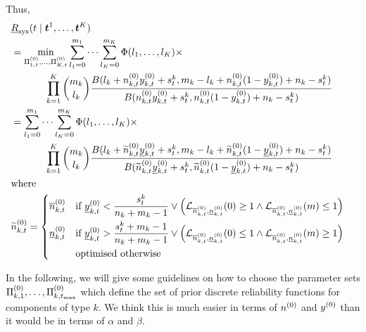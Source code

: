 \documentclass[12pt, a4paper]{elsarticle}
\newcommand{\bs}[1]{\boldsymbol{#1}}
\renewcommand{\vec}[1]{{\bs#1}}
\newcommand{\ul}[1]{\underline{#1}}
\newcommand{\ol}[1]{\overline{#1}}
\newcommand{\lRsys}{\ul{R}_\text{sys}}
\newcommand{\uRsys}{\ol{R}_\text{sys}}
\def\tmax{t_\text{max}}
\newcommand{\td}[1]{%
  \iftoggle{td}{%
    \todo[inline]{#1}%
  }{}%
}
\begin{document}
Thus,
\begin{align}
\lefteqn{\lRsys(t \mid \vec{t}^1, \ldots, \vec{t}^K)} \nonumber \\
 &= \min_{\PtZi{1}, \ldots, \PtZi{K}} 
    \sum_{l_1=0}^{m_1} \cdots \sum_{l_K=0}^{m_K} \Phi(l_1, \ldots, l_K) \times \nonumber \\ & \hspace*{8ex}
    \prod_{k=1}^K {m_k \choose l_k} \frac{B(l_k + \nktz\yktz + s^k_t, m_k - l_k + \nktz(1-\yktz) + n_k - s^k_t)}{B(\nktz\yktz + s^k_t, \nktz(1-\yktz) + n_k - s^k_t)}
    \nonumber\\
 &= \sum_{l_1=0}^{m_1} \cdots \sum_{l_K=0}^{m_K} \Phi(l_1, \ldots, l_K) \times \nonumber \\ & \hspace*{8ex}
    \prod_{k=1}^K {m_k \choose l_k} \frac{B(l_k + \nktzo\yktzl + s^k_t, m_k - l_k + \nktzo(1-\yktzl) + n_k - s^k_t)}{B(\nktzo\yktzl + s^k_t, \nktzo(1-\yktzl) + n_k - s^k_t)} \label{eq:LwrSysPost}\\
 &\mathrm{where} \nonumber \\
 &\nktzo = \left\{ \begin{aligned}
   \nktzu & \quad\mbox{if}\ \yktzl < \frac{s^k_t}{n_k + m_k - 1} \vee \Big( \mathcal{L}_{\nktzu,\nktzl}(0) \ge 1 \wedge \mathcal{L}_{\nktzu,\nktzl}(m) \le 1 \Big) \\
   \nktzl & \quad\mbox{if}\ \yktzl > \frac{s^k_t + m_k - 1}{n_k + m_k - 1} \vee \Big( \mathcal{L}_{\nktzu,\nktzl}(0) \le 1 \wedge \mathcal{L}_{\nktzu,\nktzl}(m) \ge 1 \Big) \\
   & \quad\mbox{optimised otherwise}
 \end{aligned} \right. \nonumber
\end{align}

\td{*** Louis: I've edited to here so far, will continue editing rest of this section if we are happy with the above! ***}

In the following, we will give some guidelines on how to choose the parameter sets $\PkZi{1}, \ldots, \PkZi{\tmax}$
which define the set of prior discrete reliability functions for components of type $k$.
We think this is much easier in terms of $n^{(0)}$ and $y^{(0)}$ than it would be in terms of $\alpha$ and $\beta$.
\end{document}
